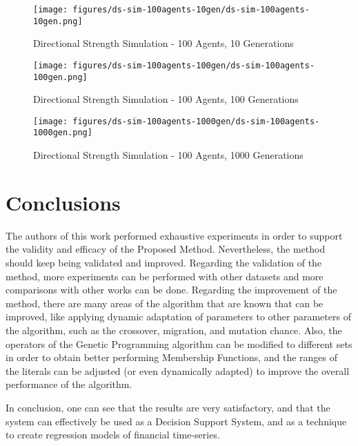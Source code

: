 \documentclass[12pt,journal,draftcls,onecolumn]{IEEEtran}
\begin{document}
\begin{figure}[htp]
\caption{Directional Strength Simulation - 100 Agents, 10 Generations}
\label{ds-prediction-10}
\begin{center}
\texttt{[image: figures/ds-sim-100agents-10gen/ds-sim-100agents-10gen.png]}
\end{center}
\end{figure}

\begin{figure}[htp]
\caption{Directional Strength Simulation - 100 Agents, 100
  Generations}
\label{ds-prediction-100}
\begin{center}
\texttt{[image: figures/ds-sim-100agents-100gen/ds-sim-100agents-100gen.png]}
\end{center}
\end{figure}

\begin{figure}[htp]
\caption{Directional Strength Simulation - 100 Agents, 1000
  Generations}
\label{ds-prediction-1000}
\begin{center}
\texttt{[image: figures/ds-sim-100agents-1000gen/ds-sim-100agents-1000gen.png]}
\end{center}
\end{figure}

\section{Conclusions}
\label{conclusions}

The authors of this work performed exhaustive experiments in order to support the validity and efficacy of the Proposed Method. Nevertheless, the method should keep being validated and improved. Regarding the validation of the method, more experiments can be performed with other datasets and more comparisons with other works can be done. Regarding the improvement of the method, there are many areas of the algorithm that are known that can be improved, like applying dynamic adaptation of parameters to other parameters of the algorithm, such as the crossover, migration, and mutation chance. Also, the operators of the Genetic Programming algorithm can be modified to different sets in order to obtain better performing Membership Functions, and the ranges of the literals can be adjusted (or even dynamically adapted) to  improve the overall performance of the algorithm.

In conclusion, one can see that the results are very satisfactory, and that the system can effectively be used as a Decision Support System, and as a technique to create regression models of financial time-series.
  
  
  


\end{document}
